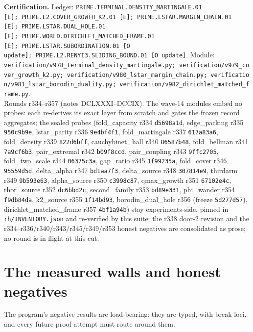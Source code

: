 \documentclass[11pt]{article}
\newcommand{\certbox}[3]{%
  \par\medskip\noindent\colorbox{certgray}{\parbox{\dimexpr\linewidth-2\fboxsep}{%
    \footnotesize\raggedright\textbf{Certification.} Ledger: \texttt{#1}.\quad
    Module: \texttt{#2}.\\ #3}}\par\medskip}
\theoremstyle{definition}
\theoremstyle{remark}
\begin{document}
\certbox{PRIME.TERMINAL.DENSITY\_MARTINGALE.01 [E];\
PRIME.L2.COVER\_GROWTH\_K2.01 [E];\
PRIME.LSTAR.MARGIN\_CHAIN.01 [E];\
PRIME.LSTAR.DUAL\_HOLE.01 [E];\
PRIME.WORLD.DIRICHLET\_MATCHED\_FRAME.01 [E];\
PRIME.LSTAR.SUBORDINATION.01 [O update];\
PRIME.L2.RENYI3.SLIDING\_BOUND.01 [O update]}%
{verification/v978\_terminal\_density\_martingale.py;\
verification/v979\_cover\_growth\_k2.py;\
verification/v980\_lstar\_margin\_chain.py;\
verification/v981\_lstar\_borodin\_duality.py;\
verification/v982\_dirichlet\_matched\_frame.py}%
{Rounds r334--r357 (notes DCLXXXI--DCCIX).  The wave-14 modules embed
no probes: each re-derives its exact layer from scratch and gates the
frozen record aggregates; the sealed probes (fold\_capacity r334
\texttt{d5698a1d}, edge\_packing r335 \texttt{950c9b9e},
lstar\_parity r336 \texttt{9e4bf4f1}, fold\_martingale r337
\texttt{617a83a6}, fold\_density r339 \texttt{822d6bff},
cauchybinet\_hall r340 \texttt{86587b48}, fold\_bellman r341
\texttt{7a9cf6b3}, pair\_extremal r342 \texttt{b09f8ccd},
pair\_coupling r343 \texttt{9ffc2705}, fold\_two\_scale r344
\texttt{06375c3a}, gap\_ratio r345 \texttt{1f99235a},
fold\_cover r346 \texttt{95559d5d}, delta\_alpha r347
\texttt{bd1aa7f3}, delta\_source r348 \texttt{307814e9},
thirdarm r349 \texttt{9b593e63}, alpha\_source r350
\texttt{c3998c87}, qmax\_growth r351 \texttt{67102e4c},
rhor\_source r352 \texttt{dc6bbd2c}, second\_family r353
\texttt{bd89e331}, phi\_wander r354 \texttt{f9db84da},
k2\_source r355 \texttt{1f14bd93}, borodin\_dual\_hole r356
(freeze \texttt{5d277d57}), dirichlet\_matched\_frame r357
\texttt{4bf1a94b}) stay experiments-side, pinned in
\texttt{rh/INVENTORY.json} and re-verified by this suite; the r338
door-2 revision and the r334--r336/r340/r343/r345/r349/r353 honest
negatives are consolidated as prose; no round is in flight at this
cut.}

\section{The measured walls and honest negatives}\label{sec:nogos}

The program's negative results are load-bearing: they are typed, with
break loci, and every future proof attempt must route around them.
\end{document}
